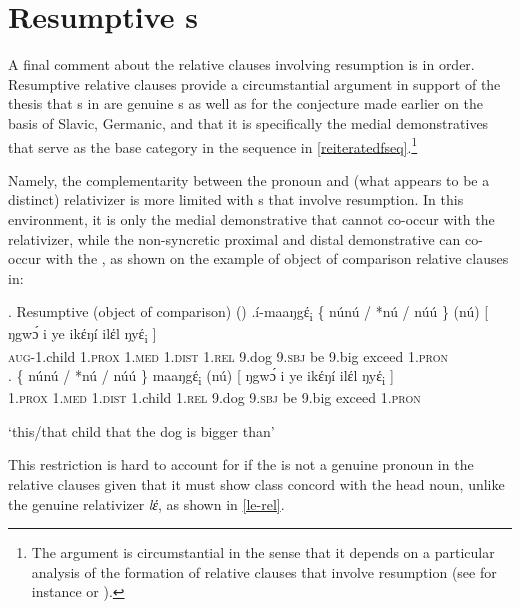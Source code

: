 \section{Resumptive s}

 A final comment about the  relative clauses involving resumption is in order. Resumptive relative clauses provide a circumstantial argument in support of the thesis that s in  are genuine s as well as for the conjecture made earlier on the basis of Slavic, Germanic, and  that it is specifically the medial demonstratives that serve as the base category in the  sequence in \ref{reiteratedfseq}.\footnote{The argument is circumstantial in the sense that it depends on a particular analysis of the formation of relative clauses that involve resumption (see for instance \citeauthor{Bianchi2004} \citeyear{Bianchi2004,Bianchi2011} or \citealt[chapters 2--3]{Salzmann2017}).
} %
\par
Namely, the complementarity between the  pronoun and (what appears to be a distinct) relativizer is more limited with s that involve resumption. In this environment, it is only the medial demonstrative that cannot co-occur with the relativizer, while the non-syncretic proximal and distal demonstrative can co-occur with the , as shown on the example of object of comparison relative clauses in:

\ex. Resumptive (object of comparison)  (\citealt[27]{Jenks-etall})
\ag.\'i-maaŋgέ\textsubscript{i} \{ n\'un\'u / *n\'u / {n\'u\'u \}} (n\'u) [ ŋgwɔ́ i ye ikέŋ\'i ilέl {ŋyέ\textsubscript{i} ]}\\
\textsc{aug}-1.child {} 1.\textsc{prox} {} \phantom{t}\textsc{1.med} {} {1.\textsc{dist}}
\phantom{l}\textsc{1.rel} {} 9.dog 9.\textsc{sbj} be 9.big exceed {1.\textsc{pron}}\\
\bg.  \{ n\'un\'u / *n\'u / {n\'u\'u \}} maaŋgέ\textsubscript{i} (n\'u) [ ŋgwɔ́ i ye ikέŋ\'i ilέl {ŋyέ\textsubscript{i} ]}\\
 {} 1.\textsc{prox} {} \phantom{t}\textsc{1.med} {} {1.\textsc{dist}} 1.child \phantom{t}\textsc{1.rel} {} 9.dog 9.\textsc{sbj} be 9.big exceed {1.\textsc{pron}}\\
\strut `this/that child that the dog is bigger than' 

This restriction is hard to account for if the  is not a genuine  pronoun in the  relative clauses given that it must show class concord with the head noun, unlike the genuine relativizer \textit{lέ}, as shown in \ref{le-rel}.

